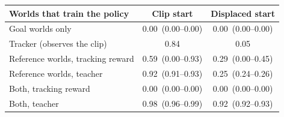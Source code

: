 \begin{tabular}{@{}lcc@{}}
\toprule
Worlds that train the policy & Clip start & Displaced start \\
\midrule
Goal worlds only & 0.00 \,{\scriptsize(0.00--0.00)} & 0.00 \,{\scriptsize(0.00--0.00)} \\
Tracker (observes the clip) & 0.84 & 0.05 \\
\midrule
Reference worlds, tracking reward & 0.59 \,{\scriptsize(0.00--0.93)} & 0.29 \,{\scriptsize(0.00--0.45)} \\
Reference worlds, teacher & 0.92 \,{\scriptsize(0.91--0.93)} & 0.25 \,{\scriptsize(0.24--0.26)} \\
Both, tracking reward & 0.00 \,{\scriptsize(0.00--0.00)} & 0.00 \,{\scriptsize(0.00--0.00)} \\
Both, teacher & 0.98 \,{\scriptsize(0.96--0.99)} & 0.92 \,{\scriptsize(0.92--0.93)} \\
\bottomrule
\end{tabular}
